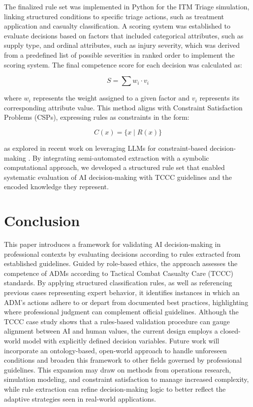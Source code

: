 \documentclass[conference]{IEEEtran}
\begin{document}
The finalized rule set was implemented in Python for the ITM Triage simulation, linking structured conditions to specific triage actions, such as treatment application and casualty classification. A scoring system was established to evaluate decisions based on factors that included categorical attributes, such as supply type, and ordinal attributes, such as injury severity, which was derived from a predefined list of possible severities in ranked order to implement the scoring system. The final competence score for each decision was calculated as:

\[
S = \sum w_i \cdot v_i
\]

where \( w_i \) represents the weight assigned to a given factor and \( v_i \) represents its corresponding attribute value. This method aligns with Constraint Satisfaction Problems (CSPs), expressing rules as constraints in the form:

\[
C(x) = \{x \mid R(x)\}
\]

as explored in recent work on leveraging LLMs for constraint-based decision-making \cite{hotz2024llm, regin_combining_2024}. By integrating semi-automated extraction with a symbolic computational approach, we developed a structured rule set that enabled systematic evaluation of AI decision-making with TCCC guidelines and the encoded knowledge they represent.


\section{Conclusion}
\label{sec:conclusion}
This paper introduces a framework for validating AI decision-making in professional contexts by evaluating decisions according to rules extracted from established guidelines. Guided by role-based ethics, the approach assesses the competence of ADMs according to Tactical Combat Casualty Care (TCCC) standards. By applying structured classification rules, as well as referencing previous cases representing expert behavior, it identifies instances in which an ADM's actions adhere to or depart from documented best practices, highlighting where professional judgment can complement official guidelines. Although the TCCC case study shows that a rules-based validation procedure can gauge alignment between AI and human values, the current design employs a closed-world model with explicitly defined decision variables. Future work will incorporate an ontology-based, open-world approach to handle unforeseen conditions and broaden this framework to other fields governed by professional guidelines. This expansion may draw on methods from operations research, simulation modeling, and constraint satisfaction to manage increased complexity, while rule extraction can refine decision-making logic to better reflect the adaptive strategies seen in real-world applications.
\\
\end{document}
